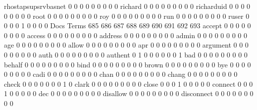 \documentclass[compress,8pt]{beamer}
\begin{document}
\begin{frame}
\begin{Schunk}
  rhostapsupsrvbasnet                        0   0   0   0   0   0   0   0   0
  richard                                    0   0   0   0   0   0   0   0   0
  richarduid                                 0   0   0   0   0   0   0   0   0
  root                                       0   0   0   0   0   0   0   0   0
  roy                                        0   0   0   0   0   0   0   0   0
  run                                        0   0   0   0   0   0   0   0   0
  ruser                                      0   0   0   0   1   0   0   0   0
                                          Docs
Terms                                      685 686 687 688 689 690 691 692 693
  accept                                     0   0   0   0   0   0   0   0   0
  access                                     0   0   0   0   0   0   0   0   0
  address                                    0   0   0   0   0   0   0   0   0
  admin                                      0   0   0   0   0   0   0   0   0
  age                                        0   0   0   0   0   0   0   0   0
  allow                                      0   0   0   0   0   0   0   0   0
  apr                                        0   0   0   0   0   0   0   0   0
  argument                                   0   0   0   0   0   0   0   0   0
  auth                                       0   0   0   0   0   0   0   0   0
  authent                                    0   1   0   0   0   0   0   0   1
  bad                                        0   0   0   0   0   0   0   0   0
  behalf                                     0   0   0   0   0   0   0   0   0
  bind                                       0   0   0   0   0   0   0   0   0
  brown                                      0   0   0   0   0   0   0   0   0
  bye                                        0   0   0   0   0   0   0   0   0
  cadi                                       0   0   0   0   0   0   0   0   0
  chan                                       0   0   0   0   0   0   0   0   0
  chang                                      0   0   0   0   0   0   0   0   0
  check                                      0   0   0   0   0   0   0   1   0
  clark                                      0   0   0   0   0   0   0   0   0
  close                                      0   0   0   1   0   0   0   0   0
  connect                                    0   0   0   1   0   0   0   0   0
  dec                                        0   0   0   0   0   0   0   0   0
  disallow                                   0   0   0   0   0   0   0   0   0
  disconnect                                 0   0   0   0   0   0   0   0   0

\end{Schunk}
\end{frame}
\end{document}

